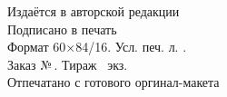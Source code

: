 \newpage
\thispagestyle{empty}
~\vfill
\begin{centering}
  \textit{\EdType}\\[18pt]
  \AuthorF\\[6pt]
  {\large\Title}\\[6pt]
  \PubType\\[18pt]
  Издаётся в авторской редакции\\
  \vspace{18pt}
  Подписано в печать \PUBDATE\\
  Формат 60×84/16. Усл. печ. л. \SHEETS.\\
  Заказ №\,\PUBORDER. Тираж \PUBCOUNT\ экз.\\
  \vspace{6pt}
  Отпечатано с готового оргинал-макета\\
  \PUBLISHER\\
  \PUBADDR\\
\end{centering}
\vspace{1cm}
